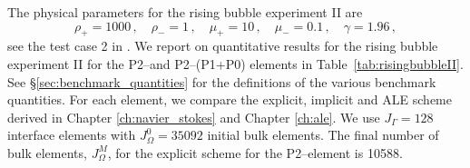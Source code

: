 The physical parameters for the rising bubble experiment II are
\begin{equation} \label{eq:Hysing2}
\rho_+ = 1000\,,\quad \rho_- = 1\,,\quad \mu_+ = 10\,,\quad \mu_- = 0.1\,,\quad
\gamma = 1.96\,,
\end{equation}
see the test case 2 in \cite[Table~I]{HysingTKPBGT09}. We report on
quantitative results for the rising bubble experiment II for the P2--\pdg and
P2--(P1+P0) elements in Table~\ref{tab:risingbubbleII}. See
\S\ref{sec:benchmark_quantities} for the definitions of the various benchmark
quantities. For each element, we compare the explicit, implicit and ALE scheme
derived in Chapter \ref{ch:navier_stokes} and Chapter \ref{ch:ale}. We use
$J_\Gamma=128$ interface elements with $J_\Omega^0=35092$ initial bulk elements.
The final number of bulk elements, $J_\Omega^M$, for the explicit scheme for
the P2--\pdg element is 10588.
